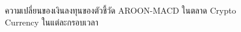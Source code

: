 \begin{figure}[!ht]
    \centering
    \caption{ความเปลี่ยนของเงินลงทุนของตัวชี้วัด AROON-MACD ในตลาด Crypto Currency ในแต่ละกรอบเวลา}
    \label{fig:aroon-macd-crypto-all}
\end{figure}

